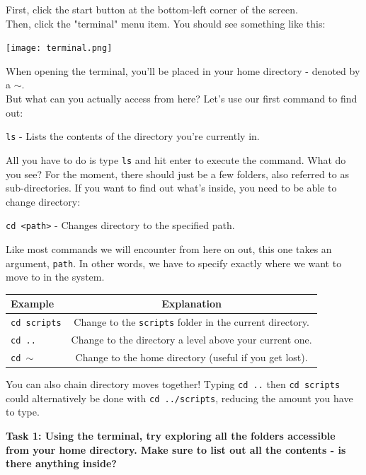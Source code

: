 \documentclass[a4paper,11pt,parskip=half-]{scrartcl}
\begin{document}
First, click the start button at the bottom-left corner of the screen. \\
Then, click the "terminal" menu item. You should see something like this:

\centering \texttt{[image: terminal.png]}

\raggedright


When opening the terminal, you'll be placed in your home directory - denoted by a $\sim$. \\ 
But what can you actually access from here? Let's use our first command to find out:

\Large \texttt{ls} \normalsize - Lists the contents of the directory you're currently in.

All you have to do is type \texttt{ls} and hit enter to execute the command. 
What do you see? 
For the moment, there should just be a few folders, also referred to as sub-directories. 
If you want to find out what's inside, you need to be able to change directory:

\Large \texttt{cd <path>} \normalsize - Changes directory to the specified path.

Like most commands we will encounter from here on out, this one takes an argument, \texttt{path}. 
In other words, we have to specify exactly where we want to move to in the system.

\centering
\begin{tabular}{l|c}
    Example & Explanation \\
    \hline
    \Large \texttt{cd scripts} \normalfont & Change to the \texttt{scripts} folder in the current directory.  \\
    \Large \texttt{cd ..} \normalfont & Change to the directory a level above your current one. \\
    \Large \texttt{cd $\sim$} \normalfont & Change to the home directory (useful if you get lost).
\end{tabular}

\raggedright

You can also chain directory moves together! 
Typing \texttt{cd ..} then \texttt{cd scripts} could alternatively be done with \texttt{cd ../scripts}, reducing the amount you have to type.

\bfseries Task 1: \normalfont 
Using the terminal, try exploring all the folders accessible from your home directory. 
Make sure to list out all the contents - is there anything inside? 
\end{document}
